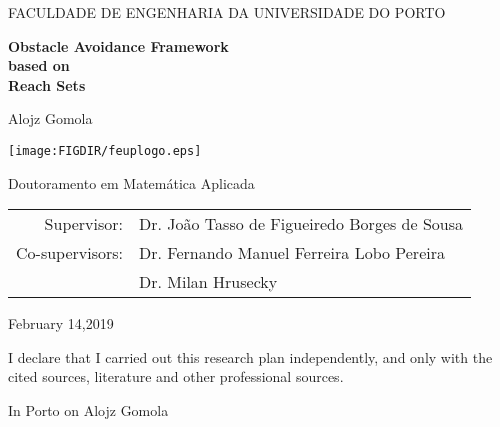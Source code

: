 \pagestyle{empty}
\begin{center}

{FACULDADE DE ENGENHARIA DA UNIVERSIDADE DO PORTO}

\vspace{3cm}
{\LARGE\bfseries Obstacle Avoidance Framework}
\\\vspace{0.5cm}
{\LARGE\bfseries based on}
\\\vspace{0.5cm}
{\LARGE\bfseries Reach Sets}

\vspace{2cm}
{\LARGE Alojz Gomola}


\vspace{3cm}
\centerline{\mbox{\texttt{[image: \\FIGDIR/feuplogo.eps]}}}


\vspace{2cm}
{\LARGE Doutoramento em Matemática Aplicada}

\vspace{1.5cm}
\begin{tabular}{rl}
Supervisor: & Dr. João Tasso de Figueiredo Borges de Sousa \\   
\noalign{\vspace{2mm}}
Co-supervisors: & Dr. Fernando Manuel Ferreira Lobo Pereira\\
\noalign{\vspace{2mm}}
& Dr. Milan Hrusecky\\ 
\end{tabular}

\vspace{2cm}
{February 14,2019}
\end{center}

\newpage

\noindent
I declare that I carried out this research plan  independently, and only with the cited sources, literature and other professional sources.

\vspace{18mm}
\noindent
In Porto on \makebox[2.5cm]{\dotfill}
\hspace*{\fill}
Alojz Gomola
\hspace*{\fill}


\newpage
\openright

\pagestyle{plain}
\setcounter{page}{1}

\tableofcontents


\newpage
\listoffigures

\newpage
\listoftables